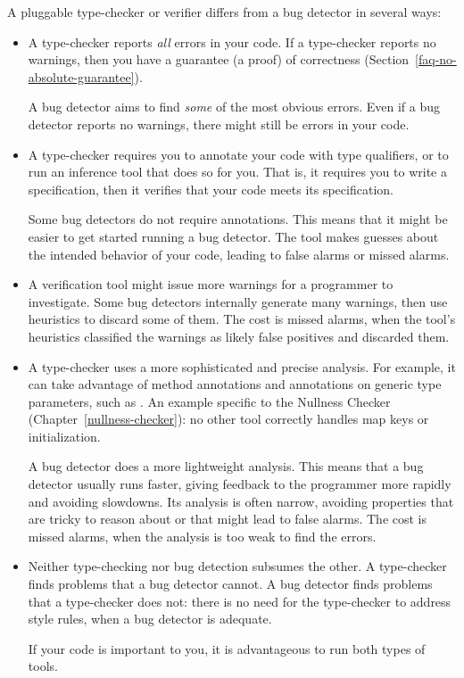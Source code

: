 A pluggable type-checker or verifier
differs from a bug detector in several ways:
\begin{itemize}
\item
  A type-checker reports \emph{all} errors in your code.  If a type-checker
  reports no warnings, then you have a guarantee (a proof) of correctness
  (Section~\ref{faq-no-absolute-guarantee}).

  A bug detector aims to find \emph{some} of the most obvious errors.  Even
  if a bug detector reports no warnings, there might still be errors in your
  code.

\item
  A type-checker requires you to annotate your code with type qualifiers,
  or to run an inference tool that does so for you.  That is, it requires
  you to write a specification, then it verifies that your code meets its
  specification.

  Some bug detectors do not require annotations.  This means that it might be
  easier to get started running a bug detector.  The tool makes guesses
  about the intended behavior of your code, leading to false alarms or
  missed alarms.

\item
  A verification tool might issue more warnings for a programmer to
  investigate.  Some bug detectors internally generate many warnings, then
  use heuristics to discard some of them.  The cost is missed alarms, when
  the tool's heuristics classified the warnings as likely false positives
  and discarded them.

\item
  A type-checker uses a more sophisticated and precise analysis.  For
  example, it can take advantage of method annotations and annotations on
  generic type parameters, such as .  An
  example specific to the Nullness Checker (Chapter~\ref{nullness-checker}):
  no other tool correctly handles map keys or initialization.

  A bug detector does a more lightweight analysis.  This means that a bug
  detector usually runs faster, giving feedback to the programmer more
  rapidly and avoiding slowdowns.  Its analysis is often narrow, avoiding
  properties that are tricky to reason about or that might lead to false
  alarms.  The cost is missed alarms, when the analysis is too weak to find the
  errors.

\item
  Neither type-checking nor bug detection subsumes the other.  A
  type-checker finds problems that a bug detector cannot.  A bug detector
  finds problems that a type-checker does not:  there is no need for the
  type-checker to address style rules, when a bug detector is adequate.

  If your code is important to you, it is advantageous to run both types of
  tools.

\end{itemize}

